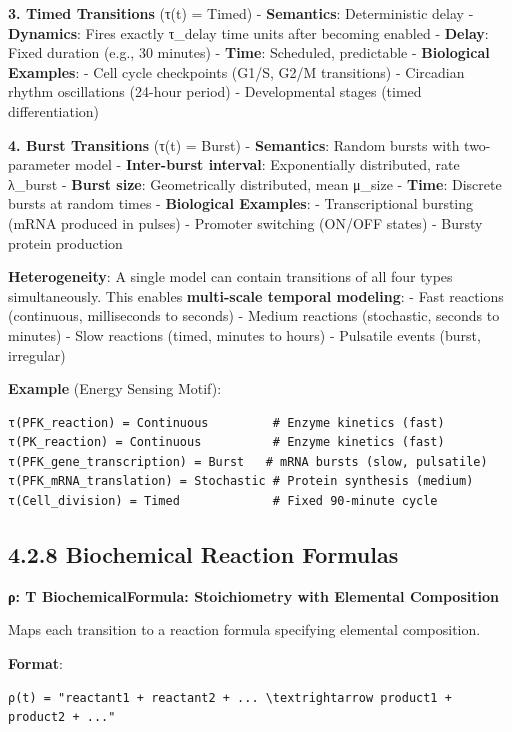 \textbf{3. Timed Transitions} (τ(t) = Timed) - \textbf{Semantics}:
Deterministic delay - \textbf{Dynamics}: Fires exactly τ\_delay time
units after becoming enabled - \textbf{Delay}: Fixed duration (e.g., 30
minutes) - \textbf{Time}: Scheduled, predictable - \textbf{Biological
Examples}: - Cell cycle checkpoints (G1/S, G2/M transitions) - Circadian
rhythm oscillations (24-hour period) - Developmental stages (timed
differentiation)

\textbf{4. Burst Transitions} (τ(t) = Burst) - \textbf{Semantics}:
Random bursts with two-parameter model - \textbf{Inter-burst interval}:
Exponentially distributed, rate λ\_burst - \textbf{Burst size}:
Geometrically distributed, mean μ\_size - \textbf{Time}: Discrete bursts
at random times - \textbf{Biological Examples}: - Transcriptional
bursting (mRNA produced in pulses) - Promoter switching (ON/OFF states)
- Bursty protein production

\textbf{Heterogeneity}: A single model can contain transitions of all
four types simultaneously. This enables \textbf{multi-scale temporal
modeling}: - Fast reactions (continuous, milliseconds to seconds) -
Medium reactions (stochastic, seconds to minutes) - Slow reactions
(timed, minutes to hours) - Pulsatile events (burst, irregular)

\textbf{Example} (Energy Sensing Motif):

\begin{lstlisting}
τ(PFK_reaction) = Continuous         # Enzyme kinetics (fast)
τ(PK_reaction) = Continuous          # Enzyme kinetics (fast)
τ(PFK_gene_transcription) = Burst   # mRNA bursts (slow, pulsatile)
τ(PFK_mRNA_translation) = Stochastic # Protein synthesis (medium)
τ(Cell_division) = Timed             # Fixed 90-minute cycle
\end{lstlisting}

\hypertarget{biochemical-reaction-formulas}{%
\subsection{4.2.8 Biochemical Reaction
Formulas}\label{biochemical-reaction-formulas}}

\textbf{ρ: T \textrightarrow BiochemicalFormula: Stoichiometry with Elemental
Composition}

Maps each transition to a reaction formula specifying elemental
composition.

\textbf{Format}:

\begin{lstlisting}
ρ(t) = "reactant1 + reactant2 + ... \textrightarrow product1 + product2 + ..."
\end{lstlisting}

